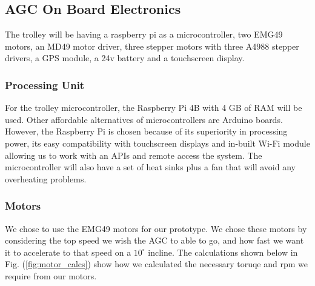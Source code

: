 \documentclass[11pt,landscape]{article}
\begin{document}
\begin{multicols}{3}
\subsection{AGC On Board Electronics}
The trolley will be having a raspberry pi as a microcontroller, two EMG49
motors, an MD49 motor driver, three stepper motors with three A4988 stepper
drivers, a GPS module, a 24v battery and a touchscreen display.

\subsubsection{Processing Unit}
For the trolley microcontroller, the Raspberry Pi 4B with 4 GB of RAM will be
used. Other affordable alternatives of microcontrollers are Arduino boards.
However, the Raspberry Pi is chosen because of its superiority in processing
power, its easy compatibility with touchscreen displays and in-built Wi-Fi
module allowing us to work with an APIs and remote access the system. The
microcontroller will also have a set of heat sinks plus a fan that will avoid
any overheating problems.


\subsubsection{Motors}
We chose to use the EMG49 motors for our prototype. We chose these motors by
considering the top speed we wish the AGC to able to go, and how fast we want it
to accelerate to that speed on a $10^\circ$ incline. The calculations shown
below in Fig. (\ref{fig:motor_calcs}) show how we calculated the necessary
toruqe and rpm we require from our motors.


\end{multicols}
\end{document}
